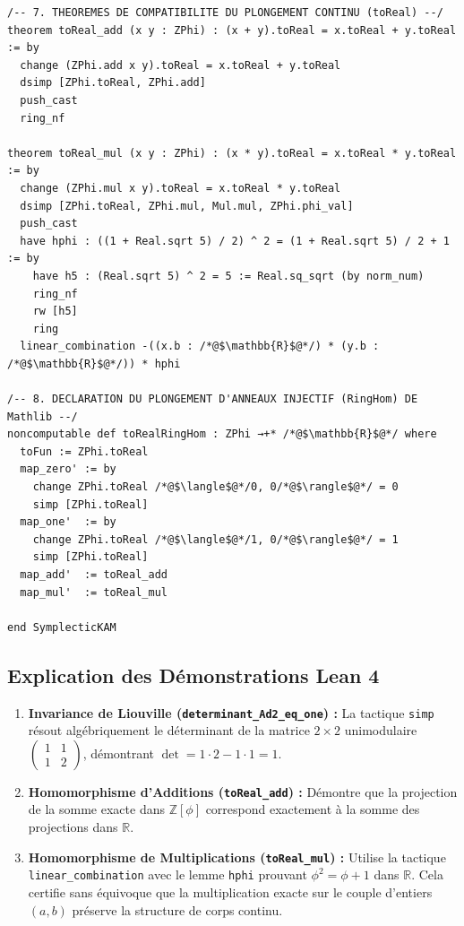 \documentclass[10pt,twocolumn,a4paper]{article}
\begin{document}
\begin{samepage}
\begin{lstlisting}[language=Lean4, caption={Code Lean 4 Certifié (Intégal 146 Lignes)}]
/-- 7. THEOREMES DE COMPATIBILITE DU PLONGEMENT CONTINU (toReal) --/
theorem toReal_add (x y : ZPhi) : (x + y).toReal = x.toReal + y.toReal := by
  change (ZPhi.add x y).toReal = x.toReal + y.toReal
  dsimp [ZPhi.toReal, ZPhi.add]
  push_cast
  ring_nf

theorem toReal_mul (x y : ZPhi) : (x * y).toReal = x.toReal * y.toReal := by
  change (ZPhi.mul x y).toReal = x.toReal * y.toReal
  dsimp [ZPhi.toReal, ZPhi.mul, Mul.mul, ZPhi.phi_val]
  push_cast
  have hphi : ((1 + Real.sqrt 5) / 2) ^ 2 = (1 + Real.sqrt 5) / 2 + 1 := by
    have h5 : (Real.sqrt 5) ^ 2 = 5 := Real.sq_sqrt (by norm_num)
    ring_nf
    rw [h5]
    ring
  linear_combination -((x.b : /*@$\mathbb{R}$@*/) * (y.b : /*@$\mathbb{R}$@*/)) * hphi

/-- 8. DECLARATION DU PLONGEMENT D'ANNEAUX INJECTIF (RingHom) DE Mathlib --/
noncomputable def toRealRingHom : ZPhi →+* /*@$\mathbb{R}$@*/ where
  toFun := ZPhi.toReal
  map_zero' := by
    change ZPhi.toReal /*@$\langle$@*/0, 0/*@$\rangle$@*/ = 0
    simp [ZPhi.toReal]
  map_one'  := by
    change ZPhi.toReal /*@$\langle$@*/1, 0/*@$\rangle$@*/ = 1
    simp [ZPhi.toReal]
  map_add'  := toReal_add
  map_mul'  := toReal_mul

end SymplecticKAM
\end{lstlisting}
\end{samepage}
\subsection{Explication des Démonstrations Lean 4}
\begin{enumerate}
\item \textbf{Invariance de Liouville (\texttt{determinant\_Ad2\_eq\_one}) :} La tactique \texttt{simp} résout algébriquement le déterminant de la matrice $2 \times 2$ unimodulaire $\begin{pmatrix} 1 & 1 \\ 1 & 2 \end{pmatrix}$, démontrant $\det = 1 \cdot 2 - 1 \cdot 1 = 1$.
\item \textbf{Homomorphisme d'Additions (\texttt{toReal\_add}) :} Démontre que la projection de la somme exacte dans $\mathbb{Z}[\phi]$ correspond exactement à la somme des projections dans $\mathbb{R}$.
\item \textbf{Homomorphisme de Multiplications (\texttt{toReal\_mul}) :} Utilise la tactique \texttt{linear\_combination} avec le lemme \texttt{hphi} prouvant $\phi^2 = \phi + 1$ dans $\mathbb{R}$. Cela certifie sans équivoque que la multiplication exacte sur le couple d'entiers $(a, b)$ préserve la structure de corps continu.
\end{enumerate}
\end{document}
